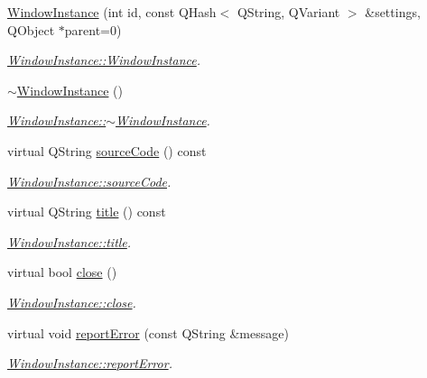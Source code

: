\begin{DoxyCompactItemize}
\item 
\hyperlink{classInstances_1_1WindowInstance_a93bf0b9976d49cb7a82d56e9ccb2d3cc}{Window\+Instance} (int id, const Q\+Hash$<$ Q\+String, Q\+Variant $>$ \&settings, Q\+Object $\ast$parent=0)
\begin{DoxyCompactList}\small\item\em \hyperlink{classInstances_1_1WindowInstance_a93bf0b9976d49cb7a82d56e9ccb2d3cc}{Window\+Instance\+::\+Window\+Instance}. \end{DoxyCompactList}\item 
\hyperlink{classInstances_1_1WindowInstance_abf76b416a3a63483a9daaf629726d7d5}{$\sim$\+Window\+Instance} ()
\begin{DoxyCompactList}\small\item\em \hyperlink{classInstances_1_1WindowInstance_abf76b416a3a63483a9daaf629726d7d5}{Window\+Instance\+::$\sim$\+Window\+Instance}. \end{DoxyCompactList}\item 
virtual Q\+String \hyperlink{classInstances_1_1WindowInstance_a9530a0b4cb1291a51bca31c7b7328f24}{source\+Code} () const 
\begin{DoxyCompactList}\small\item\em \hyperlink{classInstances_1_1WindowInstance_a9530a0b4cb1291a51bca31c7b7328f24}{Window\+Instance\+::source\+Code}. \end{DoxyCompactList}\item 
virtual Q\+String \hyperlink{classInstances_1_1WindowInstance_aae1b23157f3d6743f6db45a62bd5d5b4}{title} () const 
\begin{DoxyCompactList}\small\item\em \hyperlink{classInstances_1_1WindowInstance_aae1b23157f3d6743f6db45a62bd5d5b4}{Window\+Instance\+::title}. \end{DoxyCompactList}\item 
virtual bool \hyperlink{classInstances_1_1WindowInstance_a08129e171cbe49e26bc9d8d638502103}{close} ()
\begin{DoxyCompactList}\small\item\em \hyperlink{classInstances_1_1WindowInstance_a08129e171cbe49e26bc9d8d638502103}{Window\+Instance\+::close}. \end{DoxyCompactList}\item 
virtual void \hyperlink{classInstances_1_1WindowInstance_abf3cc6d6a38a682c1bd87f58806915dd}{report\+Error} (const Q\+String \&message)
\begin{DoxyCompactList}\small\item\em \hyperlink{classInstances_1_1WindowInstance_abf3cc6d6a38a682c1bd87f58806915dd}{Window\+Instance\+::report\+Error}. \end{DoxyCompactList}\item 

\end{DoxyCompactItemize}
